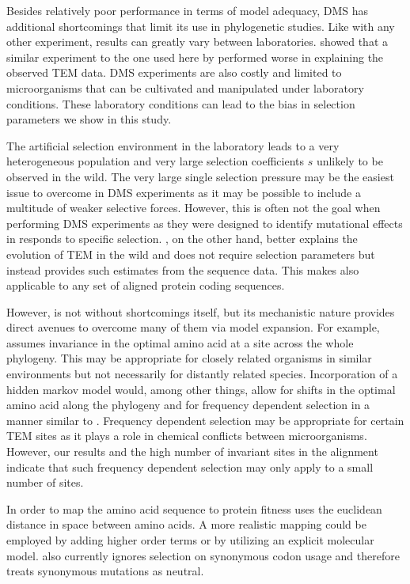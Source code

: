 Besides relatively poor performance in terms of model adequacy, DMS has additional shortcomings that limit its use in phylogenetic studies.
Like with any other experiment, results can greatly vary between laboratories.
\citet{hilton2017} showed that a similar experiment to the one used here by \citet{firnberg2014} performed worse in explaining the observed TEM data.
DMS experiments are also costly and limited to microorganisms that can be cultivated and manipulated under laboratory conditions.
These laboratory conditions can lead to the bias in selection parameters we show in this study.

The artificial selection environment in the laboratory leads to a very heterogeneous population and very large selection coefficients $s$ unlikely to be observed in the wild.
The very large single selection pressure may be the easiest issue to overcome in DMS experiments as it may be possible to include a multitude of weaker selective forces.
However, this is often not the goal when performing DMS experiments as they were designed to identify mutational effects in responds to specific selection.
\selac, on the other hand, better explains the evolution of TEM in the wild and does not require selection parameters but instead provides such estimates from the sequence data.
This makes \selac also applicable to any set of aligned protein coding sequences.

However, \selac is  not without shortcomings itself, but its mechanistic nature provides direct avenues to overcome many of them via model expansion.
For example, \selac assumes invariance in the optimal amino acid at a site across the whole phylogeny.
This may be appropriate for closely related organisms in similar environments but not necessarily for distantly related species.
Incorporation of a hidden markov model would, among other things, allow for shifts in the optimal amino acid along the phylogeny and for frequency dependent selection in a manner similar to \gy.
Frequency dependent selection may be appropriate for certain TEM sites as it plays a role in chemical conflicts between microorganisms.
However, our results and the high number of invariant sites in the alignment indicate that such frequency dependent selection may only apply to a small number of sites.

In order to map the amino acid sequence to protein fitness \selac uses the euclidean distance in \PC space between amino acids. 
A more realistic mapping could be employed by adding higher order terms or by utilizing an explicit molecular model.
\selac also currently ignores selection on synonymous codon usage and therefore treats synonymous mutations as neutral.

